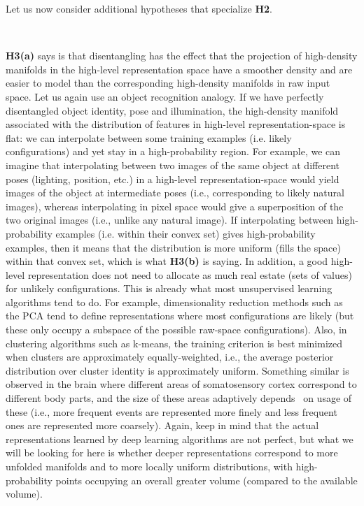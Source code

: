 Let us now consider additional hypotheses that specialize {\bf H2}.
\begin{center}
\\
\end{center} {\bf H3(a)} says is that disentangling has the effect that
the projection of high-density manifolds in the high-level representation space have a smoother
density and are easier to model than the corresponding high-density manifolds in raw
input space. Let us again use an object recognition analogy. If we have
perfectly disentangled object identity, pose and illumination, the
high-density manifold associated with the
distribution of features in high-level representation-space is flat: we can
interpolate between some training examples (i.e. likely configurations) and
yet stay in a high-probability region. For example, we can imagine that
interpolating between two images of the same object at different poses
(lighting, position, etc.) in a high-level representation-space would
yield images of the object at intermediate poses (i.e., corresponding to
likely natural images), whereas interpolating
in pixel space would give a superposition of the two original
images (i.e., unlike any natural image). If interpolating between high-probability
examples (i.e. within their convex set) gives high-probability examples, then
it means that the distribution is more uniform (fills the space) within
that convex set, which is what {\bf H3(b)} is saying. In addition, a good high-level
representation does not need to allocate as much real estate (sets of
values) for unlikely configurations. This is already what most unsupervised
learning algorithms tend to do. For example, dimensionality reduction
methods such as the PCA tend to define representations where most
configurations are likely (but these only occupy a subspace of the possible
raw-space configurations).  Also, in clustering algorithms such as k-means,
the training criterion is best minimized when clusters are approximately
equally-weighted, i.e., the average posterior distribution over cluster
identity is approximately uniform. Something similar is observed in the
brain where different areas of somatosensory cortex correspond to different
body parts, and the size of these areas adaptively depends~\citep{Flor-2003} 
on usage of these (i.e.,
more frequent events are represented more finely and less frequent ones are
represented more coarsely).  Again, keep in mind that the actual
representations learned by deep learning algorithms are not perfect, but
what we will be looking for here is whether deeper representations
correspond to more unfolded manifolds and to more locally uniform
distributions, with high-probability points occupying an overall greater
volume (compared to the available volume).

